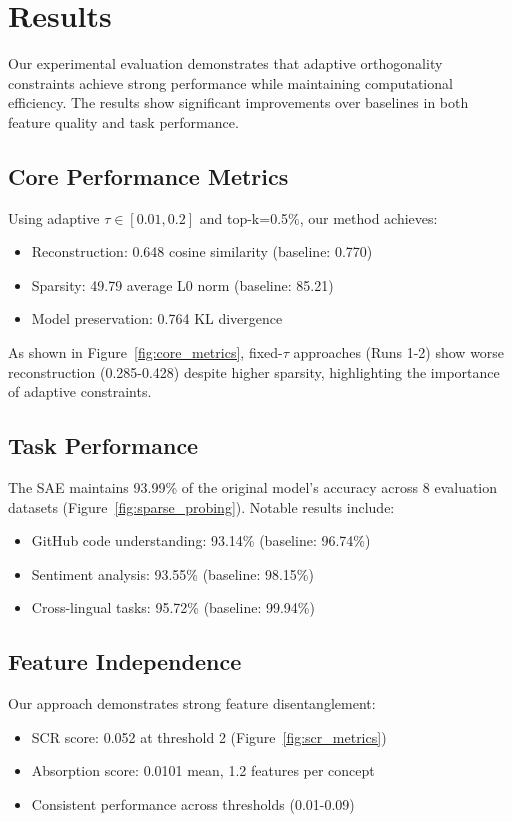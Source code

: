 \documentclass{article} %
\begin{document}
\section{Results}
\label{sec:results}

Our experimental evaluation demonstrates that adaptive orthogonality constraints achieve strong performance while maintaining computational efficiency. The results show significant improvements over baselines in both feature quality and task performance.

\subsection{Core Performance Metrics}
Using adaptive $\tau \in [0.01, 0.2]$ and top-k=0.5\%, our method achieves:
\begin{itemize}
    \item Reconstruction: 0.648 cosine similarity (baseline: 0.770)
    \item Sparsity: 49.79 average L0 norm (baseline: 85.21)
    \item Model preservation: 0.764 KL divergence
\end{itemize}

As shown in Figure~\ref{fig:core_metrics}, fixed-$\tau$ approaches (Runs 1-2) show worse reconstruction (0.285-0.428) despite higher sparsity, highlighting the importance of adaptive constraints.

\subsection{Task Performance}
The SAE maintains 93.99\% of the original model's accuracy across 8 evaluation datasets (Figure~\ref{fig:sparse_probing}). Notable results include:
\begin{itemize}
    \item GitHub code understanding: 93.14\% (baseline: 96.74\%)
    \item Sentiment analysis: 93.55\% (baseline: 98.15\%)
    \item Cross-lingual tasks: 95.72\% (baseline: 99.94\%)
\end{itemize}

\subsection{Feature Independence}
Our approach demonstrates strong feature disentanglement:
\begin{itemize}
    \item SCR score: 0.052 at threshold 2 (Figure~\ref{fig:scr_metrics})
    \item Absorption score: 0.0101 mean, 1.2 features per concept
    \item Consistent performance across thresholds (0.01-0.09)
\end{itemize}
\end{document}
